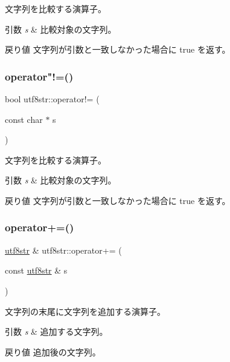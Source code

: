 文字列を比較する演算子。 
\begin{DoxyParams}{引数}
{\em s} & 比較対象の文字列。 \\
\hline
\end{DoxyParams}
\begin{DoxyReturn}{戻り値}
文字列が引数と一致しなかった場合に true を返す。 
\end{DoxyReturn}
\hypertarget{classutf8str_a90b215f868b10823c4baf3dd90a82748}{}\label{classutf8str_a90b215f868b10823c4baf3dd90a82748} 
\subsubsection{\texorpdfstring{operator"!=()}{operator!=()}\hspace{0.1cm}{\footnotesize\ttfamily [2/2]}}
{\footnotesize\ttfamily bool utf8str\+::operator!= (\begin{DoxyParamCaption}\item[{const char $\ast$}]{s }\end{DoxyParamCaption})}

文字列を比較する演算子。 
\begin{DoxyParams}{引数}
{\em s} & 比較対象の文字列。 \\
\hline
\end{DoxyParams}
\begin{DoxyReturn}{戻り値}
文字列が引数と一致しなかった場合に true を返す。 
\end{DoxyReturn}
\hypertarget{classutf8str_a4d93afca84789a1217c3bf130166d1a1}{}\label{classutf8str_a4d93afca84789a1217c3bf130166d1a1} 
\subsubsection{\texorpdfstring{operator+=()}{operator+=()}\hspace{0.1cm}{\footnotesize\ttfamily [1/2]}}
{\footnotesize\ttfamily \hyperlink{classutf8str}{utf8str} \& utf8str\+::operator+= (\begin{DoxyParamCaption}\item[{const \hyperlink{classutf8str}{utf8str} \&}]{s }\end{DoxyParamCaption})}

文字列の末尾に文字列を追加する演算子。 
\begin{DoxyParams}{引数}
{\em s} & 追加する文字列。 \\
\hline
\end{DoxyParams}
\begin{DoxyReturn}{戻り値}
追加後の文字列。 
\end{DoxyReturn}
\hypertarget{classutf8str_ad18240fdd48e3afef25e462536742b1a}{}\label{classutf8str_ad18240fdd48e3afef25e462536742b1a} 
